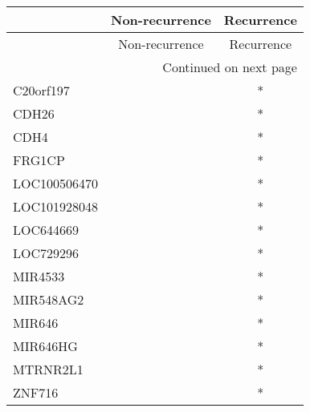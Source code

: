 \begin{longtable}{lcc}
\toprule
{} & Non-recurrence & Recurrence \\
\midrule
\endfirsthead

\toprule
{} & Non-recurrence & Recurrence \\
\midrule
\endhead
\midrule
\multicolumn{3}{r}{{Continued on next page}} \\
\midrule
\endfoot

\bottomrule
\endlastfoot
C20orf197    &                &          * \\
CDH26        &                &          * \\
CDH4         &                &          * \\
FRG1CP       &                &          * \\
LOC100506470 &                &          * \\
LOC101928048 &                &          * \\
LOC644669    &                &          * \\
LOC729296    &                &          * \\
MIR4533      &                &          * \\
MIR548AG2    &                &          * \\
MIR646       &                &          * \\
MIR646HG     &                &          * \\
MTRNR2L1     &                &          * \\
ZNF716       &                &          * \\
\end{longtable}
